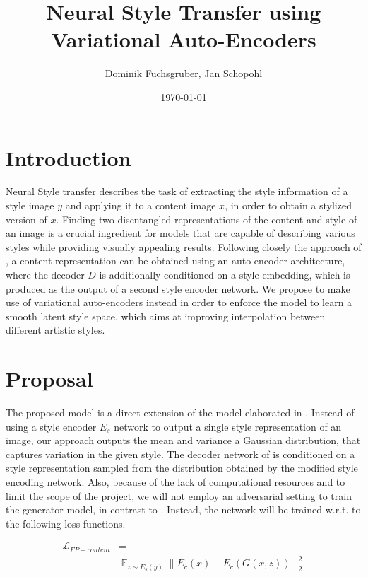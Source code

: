 \documentclass[twoside,twocolumn]{article}
\title{Neural Style Transfer using Variational Auto-Encoders} %
\author{Dominik Fuchsgruber, Jan Schopohl}
\date{\today} %
\begin{document}
\maketitle

\section{Introduction}

Neural Style transfer describes the task of extracting the style information of a style image $y$ and applying it to a content image $x$, in order to obtain a stylized version of $x$. Finding two disentangled representations of the content and style of an image is a crucial ingredient for models that are capable of describing various styles while providing visually appealing results. Following closely the approach of \cite{Kotovenko_2019_ICCV}, a content representation can be obtained using an auto-encoder architecture, where the decoder $D$ is additionally conditioned on a style embedding, which is produced as the output of a second style encoder network. We propose to make use of variational auto-encoders \cite{vae} instead in order to enforce the model to learn a smooth latent style space, which aims at improving interpolation between different artistic styles. 

\section{Proposal}

The proposed model is a direct extension of the model elaborated in \cite{Kotovenko_2019_ICCV}. Instead of using a style encoder $E_s$ network to output a single style representation of an image, our approach outputs the mean and variance a Gaussian distribution, that captures variation in the given style. The decoder network of \cite{Kotovenko_2019_ICCV} is conditioned on a style representation sampled from the distribution obtained by the modified style encoding network. Also, because of the lack of computational resources and to limit the scope of the project, we will not employ an adversarial setting to train the generator model, in contrast to \cite{Kotovenko_2019_ICCV}. Instead, the network will be trained w.r.t. to the following loss functions.

\begin{equation}
\begin{split}
	\mathcal{L}_{FP-content} & = \\ & \mathop{\mathbb{E}}_{z \sim E_s(y)} \lVert E_c(x) - E_c(G(x, z))\rVert_2^2
\label{eq:lfpcontent}
\end{split}
\end{equation}
\end{document}
